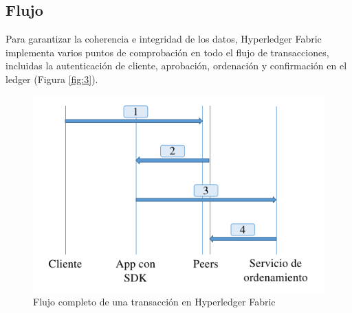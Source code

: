 \subsection{Flujo}
Para garantizar la coherencia e integridad de los datos, Hyperledger Fabric implementa varios puntos de comprobación en todo el flujo de transacciones, incluidas la autenticación de cliente, aprobación, ordenación y confirmación en el ledger (Figura \ref{fig:3}).

\begin{figure}[h]
	\centering
	\includegraphics[scale=0.5]{Graphics/txflow.png}
	\caption{Flujo completo de una transacción en Hyperledger Fabric}
	\label{fig:4}
\end{figure}

